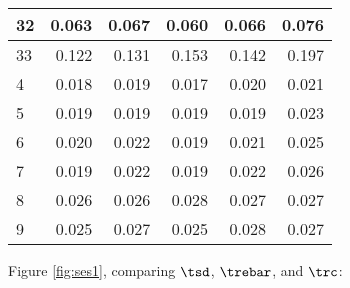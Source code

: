 \documentclass[12pt]{article}\usepackage[]{graphicx}\usepackage[]{color}
\begin{document}
\begin{table}
\begin{tabular}[t]{l|r|r|r|r|r}
\hline
32 & 0.063 & 0.067 & 0.060 & 0.066 & 0.076\\
\hline
33 & 0.122 & 0.131 & 0.153 & 0.142 & 0.197\\
\hline
4 & 0.018 & 0.019 & 0.017 & 0.020 & 0.021\\
\hline
5 & 0.019 & 0.019 & 0.019 & 0.019 & 0.023\\
\hline
6 & 0.020 & 0.022 & 0.019 & 0.021 & 0.025\\
\hline
7 & 0.019 & 0.022 & 0.019 & 0.022 & 0.026\\
\hline
8 & 0.026 & 0.026 & 0.028 & 0.027 & 0.027\\
\hline
9 & 0.025 & 0.027 & 0.025 & 0.028 & 0.027\\
\hline
\end{tabular}
\end{table}



Figure \ref{fig:ses1}, comparing
$\tsd$,
$\trebar$, and $\trc$:
\end{document}
